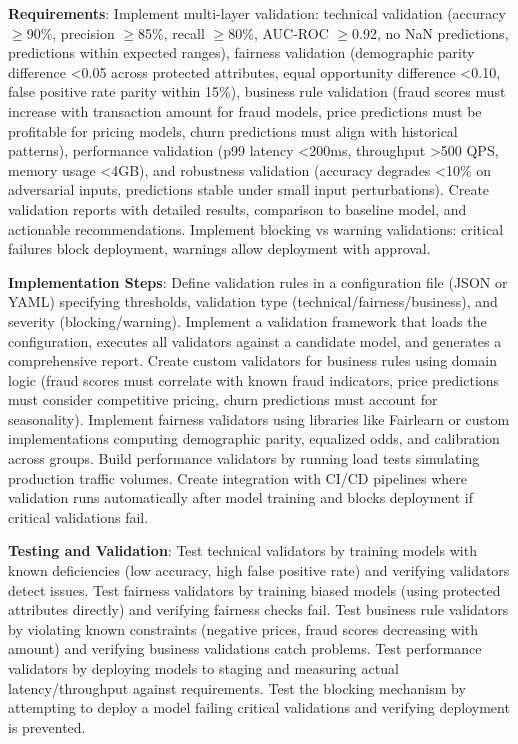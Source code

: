\textbf{Requirements}: Implement multi-layer validation: technical validation (accuracy \ensuremath{\geq}90\%, precision \ensuremath{\geq}85\%, recall \ensuremath{\geq}80\%, AUC-ROC \ensuremath{\geq}0.92, no NaN predictions, predictions within expected ranges), fairness validation (demographic parity difference <0.05 across protected attributes, equal opportunity difference <0.10, false positive rate parity within 15\%), business rule validation (fraud scores must increase with transaction amount for fraud models, price predictions must be profitable for pricing models, churn predictions must align with historical patterns), performance validation (p99 latency <200ms, throughput >500 QPS, memory usage <4GB), and robustness validation (accuracy degrades <10\% on adversarial inputs, predictions stable under small input perturbations). Create validation reports with detailed results, comparison to baseline model, and actionable recommendations. Implement blocking vs warning validations: critical failures block deployment, warnings allow deployment with approval.

\textbf{Implementation Steps}: Define validation rules in a configuration file (JSON or YAML) specifying thresholds, validation type (technical/fairness/business), and severity (blocking/warning). Implement a validation framework that loads the configuration, executes all validators against a candidate model, and generates a comprehensive report. Create custom validators for business rules using domain logic (fraud scores must correlate with known fraud indicators, price predictions must consider competitive pricing, churn predictions must account for seasonality). Implement fairness validators using libraries like Fairlearn or custom implementations computing demographic parity, equalized odds, and calibration across groups. Build performance validators by running load tests simulating production traffic volumes. Create integration with CI/CD pipelines where validation runs automatically after model training and blocks deployment if critical validations fail.

\textbf{Testing and Validation}: Test technical validators by training models with known deficiencies (low accuracy, high false positive rate) and verifying validators detect issues. Test fairness validators by training biased models (using protected attributes directly) and verifying fairness checks fail. Test business rule validators by violating known constraints (negative prices, fraud scores decreasing with amount) and verifying business validations catch problems. Test performance validators by deploying models to staging and measuring actual latency/throughput against requirements. Test the blocking mechanism by attempting to deploy a model failing critical validations and verifying deployment is prevented.

